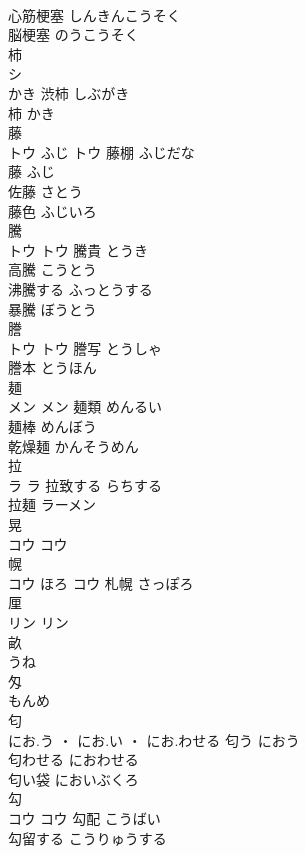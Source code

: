\documentclass[8pt]{extreport}
\begin{document}
\begin{CJK}{UTF8}{min}
\\	心筋梗塞	しんきんこうそく	
\\	脳梗塞	のうこうそく	
\\	柿	
\\	シ
\\	かき		渋柿	しぶがき	
\\	柿	かき	
\\	藤	
\\	トウ	ふじ	トウ	藤棚	ふじだな	
\\	藤	ふじ	
\\	佐藤	さとう	
\\	藤色	ふじいろ	
\\	騰	
\\	トウ		トウ	騰貴	とうき	
\\	高騰	こうとう	
\\	沸騰する	ふっとうする	
\\	暴騰	ぼうとう	
\\	謄	
\\	トウ		トウ	謄写	とうしゃ	
\\	謄本	とうほん	
\\	麺	
\\	メン		メン	麺類	めんるい	
\\	麺棒	めんぼう	
\\	乾燥麺	かんそうめん	
\\	拉	
\\	ラ		ラ	拉致する	らちする	
\\	拉麺	ラーメン	
\\	晃	
\\	コウ		コウ																																			
\\	幌	
\\	コウ	ほろ	コウ													札幌	さっぽろ	
\\	厘	
\\	リン		リン																																			
\\	畝	
\\	うね																																				
\\	匁	
\\	もんめ																																				
\\	匂	
\\	にお.う ・ にお.い ・ にお.わせる		匂う	におう	
\\	匂わせる	におわせる	
\\	匂い袋	においぶくろ	
\\	勾	
\\	コウ		コウ	勾配	こうばい	
\\	勾留する	こうりゅうする	

\end{CJK}
\end{document}
